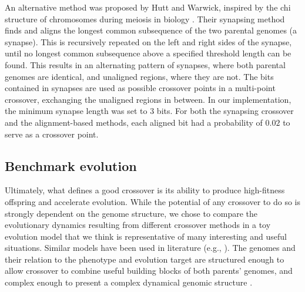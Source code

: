 \documentclass[10pt]{article}
\renewcommand{\paragraph}[1]{\textbf{#1}\hspace{2ex}}
\renewcommand{\paragraph}[1]{}
\begin{document}
\paragraph{Synapsing} An alternative method was proposed by Hutt and Warwick,
inspired by the chi structure of chromosomes during meiosis in biology
\cite{hutt2007}. Their synapsing method finds and aligns the longest common
subsequence of the two parental genomes (a synapse). This is recursively
repeated on the left and right sides of the synapse, until no longest common
subsequence above a specified threshold length can be found. This results in an
alternating pattern of synapses, where both parental genomes are identical, and
unaligned regions, where they are not. The bits contained in synapses are used
as possible crossover points in a
multi-point crossover, exchanging the unaligned regions in between.
In our implementation, the minimum synapse length was set to 3 bits.
For both the synapsing crossover and the alignment-based methods,
each aligned bit had a probability of $0.02$ to serve as a
crossover point.


\subsection{Benchmark evolution}
Ultimately, what defines a good crossover is its ability to produce
high-fitness offspring and accelerate evolution. While the
potential of any crossover to do so
 is strongly dependent on the genome structure, we chose to compare
the evolutionary dynamics resulting from different crossover methods in a
toy evolution model that we think is representative of many interesting
and useful situations. Similar models have been used in literature
(e.g., \cite{batut2013,beslon2010}).
The genomes and their relation to the phenotype and evolution target are
structured enough to allow crossover to combine useful building blocks of
both parents' genomes, and complex enough to present a complex dynamical
genomic structure \cite{batut2013}.
\end{document}
